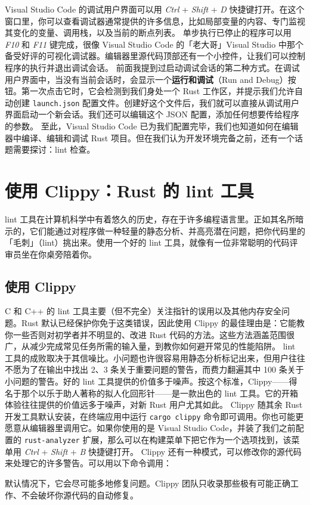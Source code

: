 \label{idx:idx_af0b9ebf}
\label{idx:idx_77bf2c5c}
Visual Studio Code 的调试用户界面可以用 \emph{Ctrl} + \emph{Shift} + \emph{D} 快捷键打开。在这个窗口里，你可以查看调试器通常提供的许多信息，比如局部变量的内容、专门监视其变化的变量、调用栈，以及当前的断点列表。
单步执行已停止的程序可以用 \emph{F10} 和 \emph{F11} 键完成，很像 Visual Studio Code 的「老大哥」Visual Studio 中那个备受好评的可视化调试器。编辑器里源代码顶部还有一个小控件，让我们可以控制程序的执行并退出调试会话。
前面我提到过启动调试会话的第二种方式。在调试用户界面中，当没有当前会话时，会显示一个\textbf{运行和调试}（Run and Debug）按钮。第一次点击它时，它会检测到我们身处一个 Rust 工作区，并提示我们允许自动创建 \texttt{launch.json} 配置文件。创建好这个文件后，我们就可以直接从调试用户界面启动一个新会话。我们还可以编辑这个 JSON 配置，添加任何想要传给程序的参数。
至此，Visual Studio Code 已为我们配置完毕，我们也知道如何在编辑器中编译、编辑和调试 Rust 项目。但在我们认为开发环境完备之前，还有一个话题需要探讨：lint 检查。
\section{使用 Clippy：Rust 的 lint 工具}
\label{idx:idx_5c3d7669}
\label{idx:idx_ea6d7ebd}
lint 工具在计算机科学中有着悠久的历史，存在于许多编程语言里。正如其名所暗示的，它们能通过对程序做一种轻量的静态分析、并高亮潜在问题，把你代码里的「毛刺」（lint）挑出来。使用一个好的 lint 工具，就像有一位非常聪明的代码评审员坐在你桌旁陪着你。
\subsection{使用 Clippy}
\label{idx:idx_b03a4df7}
C 和 C++ 的 lint 工具主要（但不完全）关注指针的误用以及其他内存安全问题。Rust 默认已经保护你免于这类错误，因此使用 Clippy 的最佳理由是：它能教你一些否则对初学者并不明显的、改进 Rust 代码的方法。这些方法涵盖范围很广，从减少完成常见任务所需的输入量，到教你如何避开常见的性能陷阱。
lint 工具的成败取决于其信噪比。小问题也许很容易用静态分析标记出来，但用户往往不愿为了在输出中找出 2、3 条关于重要问题的警告，而费力翻遍其中 100 条关于小问题的警告。好的 lint 工具提供的价值多于噪声。按这个标准，Clippy——得名于那个以乐于助人著称的拟人化回形针——是一款出色的 lint 工具。它的开箱体验往往提供的价值远多于噪声，对新 Rust 用户尤其如此。
Clippy 随其余 Rust 开发工具默认安装，在终端应用中运行 \texttt{cargo clippy} 命令即可调用。你也可能更愿意从编辑器里调用它。如果你使用的是 Visual Studio Code，并装了我们之前配置的 \texttt{rust-\allowbreak{}analyzer} 扩展，那么可以在构建菜单下把它作为一个选项找到，该菜单用 \emph{Ctrl} + \emph{Shift} + \emph{B} 快捷键打开。
Clippy 还有一种模式，可以修改你的源代码来处理它的许多警告。可以用以下命令调用：
\label{idx:idx_d06e3b2d}
默认情况下，它会尽可能多地修复问题。Clippy 团队只收录那些极有可能正确工作、不会破坏你源代码的自动修复。
